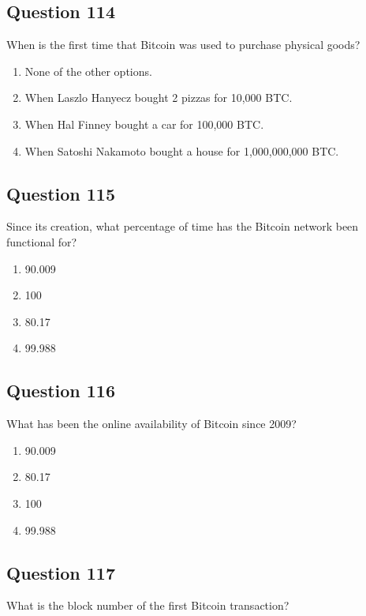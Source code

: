 \documentclass[12pt,a4paper]{article}
\begin{document}
\subsection*{Question 114}
When is the first time that Bitcoin was used to purchase physical goods?

\begin{enumerate}[label=\Alph*., leftmargin=*]
\item None of the other options.
\item When Laszlo Hanyecz bought 2 pizzas for 10,000 BTC.
\item When Hal Finney bought a car for 100,000 BTC.
\item When Satoshi Nakamoto bought a house for 1,000,000,000 BTC.
\end{enumerate}

\bigskip


\subsection*{Question 115}
Since its creation, what percentage of time has the Bitcoin network been functional for?

\begin{enumerate}[label=\Alph*., leftmargin=*]
\item 90.009%
\item 100%
\item 80.17%
\item 99.988%
\end{enumerate}

\bigskip


\subsection*{Question 116}
What has been the online availability of Bitcoin since 2009?

\begin{enumerate}[label=\Alph*., leftmargin=*]
\item 90.009%
\item 80.17%
\item 100%
\item 99.988%
\end{enumerate}

\bigskip


\subsection*{Question 117}
What is the block number of the first Bitcoin transaction?
\end{document}
